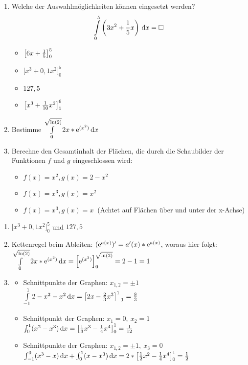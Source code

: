 \begin{enumerate}
	\item Welche der Auswahlmöglichkeiten können eingesetzt werden?
	\begin{equation*}
		\int\limits_0^5 \left(3x^2+ \frac 1 5 x\right)  \,\mathrm{d} x = \Box
	\end{equation*}
  \begin{multicols}{4}
    \begin{itemize}
      \item $\left[ 6x + \frac{1}{5} \right]_0^5$
      \item $\bigg[x^3 + 0,1 x^2\bigg]_0^5$
  		\item $127,5$
      \item $\left[ x^3 + \frac{1}{10} x^2 \right]_1^6$
  	\end{itemize}
  \end{multicols}


	\item Bestimme $\int\limits_0^{\sqrt{\ln(2)}} 2x*\mathrm{e}^{(x^2)} \,\mathrm{d} x$
  \item Berechne den Gesamtinhalt der Flächen, die durch die Schaubilder der Funktionen $f$ und $g$ eingeschlossen wird:
  \begin{itemize}
    \item $f(x)=x^2, g(x)=2-x^2$
    \item $f(x)=x^3, g(x)=x^2$
    \item $f(x)=x^3, g(x)=x\ $ (Achtet auf Flächen über und unter der x-Achse)
  \end{itemize}
\end{enumerate}
\begin{lsg}{}
  \begin{enumerate}
    \item $\bigg[x^3 + 0,1 x^2\bigg]_0^5$ und $127,5$
    \item Kettenregel beim Ableiten: $(\mathrm{e}^{a(x)})'=a'(x)*\mathrm{e}^{a(x)}$, woraus hier folgt:\\ $\int\limits_0^{\sqrt{\ln(2)}} 2x*\mathrm{e}^{(x^2)} \,\mathrm{d} x = \left[\mathrm{e}^{(x^2)}\right]_0^{\sqrt{\ln(2)}}=2-1=1$
    \item
    \begin{itemize}
      \item Schnittpunkte der Graphen: $x_{1,2}=\pm 1$\\ $\int\limits_{-1}^1 2-x^2-x^2\,\mathrm{d} x=\left[2x-\frac{2}{3}x^3\right]_{-1}^1=\frac 8 3$
      \item Schnittpunkt der Graphen: $x_1=0,\ x_2=1$ \\$\int_0^1 (x^2-x^3)\,\mathrm{d} x=\left[\frac{1}{3}x^3-\frac{1}{4}x^4\right]_0^1=\frac 1 {12}$
      \item Schnittpunkte der Graphen: $x_{1,2}=\pm 1,\ x_3=0$ \\$\int_{-1}^0 (x^3-x)\,\mathrm{d} x+\int_0^1 (x-x^3)\,\mathrm{d} x=2*\left[\frac{1}{2}x^2-\frac{1}{4}x^4\right]_0^1=\frac 1 2$
    \end{itemize}
  \end{enumerate}
\end{lsg}






